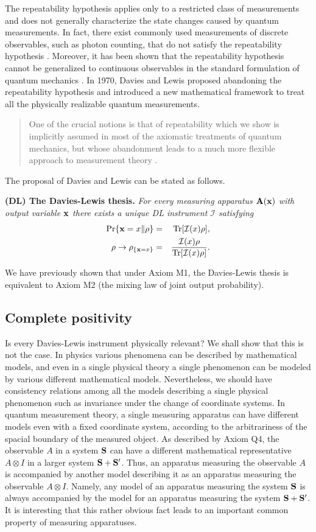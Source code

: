 \documentclass[12pt]{article}
\newcommand{\beqa}{\begin{eqnarray}}
\newcommand{\eeqa}{\end{eqnarray}}
\newcommand{\bA}{{\bf A}}
\newcommand{\bS}{{\bf S}}
\newcommand{\cI}{{\mathcal I}}
\newcommand{\rh}{\rho}
\newcommand{\Tr}{\mbox{\rm Tr}}
\newcommand{\bx}{{\bf x}}
\begin{document}
The repeatability hypothesis applies only to a restricted class of measurements 
and does not generally characterize the state changes caused 
by quantum measurements.
In fact, there exist commonly used measurements of discrete observables,
such as photon counting, that do not satisfy the repeatability hypothesis \cite{IUO90}.
Moreover,  it has been shown that the repeatability hypothesis cannot be generalized 
to continuous observables in the standard formulation of quantum mechanics
\cite{84QC,85CA,Sri80,88MR}.
In 1970, Davies and Lewis \cite{DL70} proposed abandoning the repeatability
hypothesis and introduced a new mathematical framework to treat 
all the physically realizable quantum measurements.
\begin{quote}
One of the crucial notions is that of repeatability which we show is implicitly
assumed in most of the axiomatic treatments of quantum mechanics, but whose
abandonment leads to a much more flexible approach to measurement theory
\cite[p.~239]{DL70}.
\end{quote}

The proposal of Davies and Lewis \cite{DL70} can be stated as follows.
\bigskip

{\bf  (DL) The Davies-Lewis thesis.}
{\em For every measuring apparatus $\bA(\bx)$ with output variable $\bx$ 
there exists  a unique DL instrument
$\cI$ satisfying
\beqa
\Pr\{\bx=x\|\rh\}&=&\Tr[\cI(x)\rh],\\
\rh\to\rh_{\{\bx=x\}}&=&
\frac{\cI(x)\rh}{\Tr[\cI(x)\rh]}.
\eeqa}
\bigskip

We have previously shown that under Axiom M1, the Davies-Lewis thesis is 
equivalent to Axiom M2 (the mixing law of joint output probability).

\subsection{Complete positivity}

Is every Davies-Lewis instrument physically relevant?
We shall show that this is not the case.
In physics various phenomena can be described by mathematical models,
and even in a single physical theory a single phenomenon can be modeled
by various different mathematical models.   
Nevertheless, we should have consistency relations among all the models
describing a single physical phenomenon such as invariance under the 
change of coordinate systems.
In quantum measurement theory, a single measuring apparatus can have
different models even with a fixed coordinate system, according to the
arbitrariness of the spacial boundary of the measured object.
As described by Axiom Q4, the observable $A$ in a system $\bS$ can 
have a different mathematical representative $A\otimes I$ in a larger system
$\bS+\bS'$.
Thus, an apparatus measuring the observable $A$ is accompanied by another model
describing it as an apparatus measuring the observable $A\otimes I$.
Namely, any model of an apparatus measuring the system $\bS$ is always  accompanied
by the model for an apparatus measuring the system $\bS+\bS'$.
It is interesting that this rather obvious fact leads to an important common 
property of measuring apparatuses.
\bigskip
\end{document}
